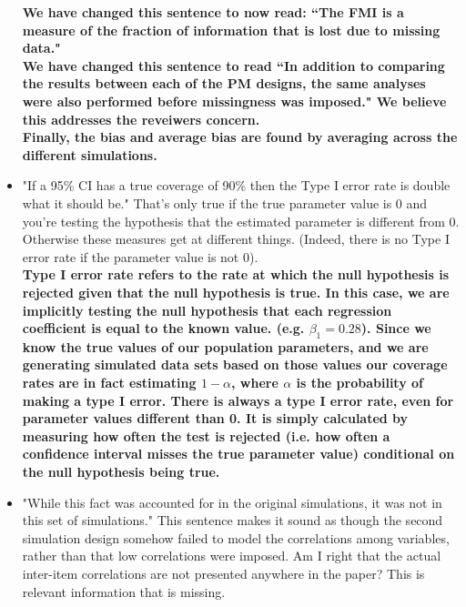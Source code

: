 \documentclass[letterpaper,12pt]{article}\usepackage[]{graphicx}\usepackage[]{color}
\begin{document}
\begin{itemize}
{\bf We have changed this sentence to now read: ``The FMI is a measure of the fraction of information that is lost due to missing data."\\

We have changed this sentence to read ``In addition to comparing the results between each of the PM designs, the same analyses were also performed before missingness was imposed." We believe this addresses the reveiwers concern.  \\

Finally, the bias and average bias are found by averaging across the different simulations.  }\\

\item "If a 95\% CI has a true coverage of 90\% then the Type I error rate is double what it should be." That's only true if the true parameter value is 0 and you're testing the hypothesis that the estimated parameter is different from 0. Otherwise these measures get at different things. (Indeed, there is no Type I error rate if the parameter value is not 0).\\

{\bf Type I error rate refers to the rate at which the null hypothesis is rejected given that the null hypothesis is true.  In this case, we are implicitly testing the null hypothesis that each regression coefficient is equal to the known value.  (e.g. $\beta_1 = 0.28$).  Since we know the true values of our population parameters, and we are generating simulated data sets based on those values our coverage rates are in fact estimating $1 - \alpha$, where $\alpha$ is the probability of making a type I error.  There is always a type I error rate, even for parameter values different than 0.  It is simply calculated by measuring how often the test is rejected (i.e. how often a confidence interval misses the true parameter value) conditional on the null hypothesis being true.}\\


\item "While this fact was accounted for in the original simulations, it was not in this set of simulations." This sentence makes it sound as though the second simulation design somehow failed to model the correlations among variables, rather than that low correlations were imposed. Am I right that the actual inter-item correlations are not presented anywhere in the paper? This is relevant information that is missing.\\


\end{itemize}
\end{document}
